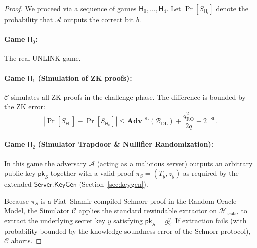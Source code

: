 \documentclass[11pt]{article}
\theoremstyle{definitionstyle}
\theoremstyle{plain}
\newcommand{\advantage}[1]{\mathbf{Adv}^{\mathrm{#1}}}
\begin{document}
\begin{proof}
We proceed via a sequence of games $\mathsf{H}_0,\dots,\mathsf{H}_4$. Let $\Pr[S_{\mathsf{H}_i}]$ denote the probability that $\mathcal{A}$ outputs the correct bit $b$.

\paragraph{Game $\mathsf{H}_0$:} The real UNLINK game.

\paragraph{Game $\mathsf{H}_1$ (Simulation of ZK proofs):} $\mathcal{C}$ simulates all ZK proofs in the challenge phase. The difference is bounded by the ZK error:
\[
|\Pr[S_{\mathsf{H}_1}] - \Pr[S_{\mathsf{H}_0}]| \le \advantage{DL}(\mathcal{B}_{\text{DL}}) + \frac{q_{\text{RO}}^2}{2q} + 2^{-80}.
\]

\paragraph{Game $\mathsf{H}_2$ (Simulator Trapdoor \& Nullifier Randomization):}
In this game the adversary $\mathcal{A}$ (acting as a malicious server) outputs an arbitrary public key $\mathsf{pk}_S$ together with a valid proof $\pi_S = (T_y, z_y)$ as required by the extended $\mathsf{Server.KeyGen}$ (Section~\ref{sec:keygen}).

Because $\pi_S$ is a Fiat--Shamir compiled Schnorr proof in the Random Oracle Model, the Simulator $\mathcal{C}$ applies the standard rewindable extractor on $\mathcal{H}_{\mathsf{scalar}}$ to extract the underlying secret key $y$ satisfying $\mathsf{pk}_S = g_2^y$.  If extraction fails (with probability bounded by the knowledge-soundness error of the Schnorr protocol), $\mathcal{C}$ aborts.


\end{proof}
\end{document}
